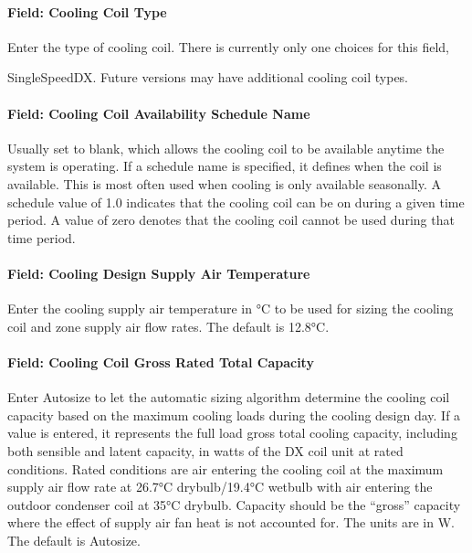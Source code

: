 \paragraph{Field: Cooling Coil Type}\label{field-cooling-coil-type-6}

Enter the type of cooling coil. There is currently only one choices for this field,

SingleSpeedDX. Future versions may have additional cooling coil types.

\paragraph{Field: Cooling Coil Availability Schedule Name}\label{field-cooling-coil-availability-schedule-name-5}

Usually set to blank, which allows the cooling coil to be available anytime the system is operating. If a schedule name is specified, it defines when the coil is available. This is most often used when cooling is only available seasonally. A schedule value of 1.0 indicates that the cooling coil can be on during a given time period. A value of zero denotes that the cooling coil cannot be used during that time period.

\paragraph{Field: Cooling Design Supply Air Temperature}\label{field-cooling-design-supply-air-temperature-1}

Enter the cooling supply air temperature in °C to be used for sizing the cooling coil and zone supply air flow rates. The default is 12.8°C.

\paragraph{Field: Cooling Coil Gross Rated Total Capacity}\label{field-cooling-coil-gross-rated-total-capacity-5}

Enter Autosize to let the automatic sizing algorithm determine the cooling coil capacity based on the maximum cooling loads during the cooling design day. If a value is entered, it represents the full load gross total cooling capacity, including both sensible and latent capacity, in watts of the DX coil unit at rated conditions. Rated conditions are air entering the cooling coil at the maximum supply air flow rate at 26.7°C drybulb/19.4°C wetbulb with air entering the outdoor condenser coil at 35°C drybulb. Capacity should be the ``gross'' capacity where the effect of supply air fan heat is not accounted for. The units are in W. The default is Autosize.

